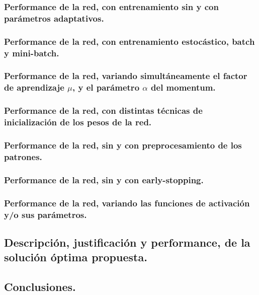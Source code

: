 \subsubsection{Performance de la red, con entrenamiento sin y con parámetros adaptativos.}

\subsubsection{Performance de la red, con entrenamiento estocástico, batch y mini-batch.}

\subsubsection{Performance de la red, variando simultáneamente el factor de aprendizaje $\mu$, y el parámetro $\alpha$ del momentum.}

\subsubsection{Performance de la red, con distintas técnicas de inicialización de los pesos de la red.}

\subsubsection{Performance de la red, sin y con preprocesamiento de los patrones.}

\subsubsection{Performance de la red, sin y con early-stopping.}

\subsubsection{Performance de la red, variando las funciones de activación y/o sus parámetros.}


\subsection{Descripción, justificación y performance, de la solución óptima propuesta.}


\subsection{Conclusiones.}